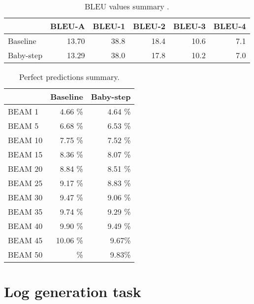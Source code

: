 \begin{table}[h!]
    \centering
    \begin{tabular}{l|r|r|r|r|r}
     & BLEU-A & BLEU-1 & BLEU-2 & BLEU-3 & BLEU-4\\ [0.5ex] 
     \hline
     Baseline & 13.70 & 38.8 & 18.4 & 10.6 & 7.1\\  
     Baby-step & 13.29 & 38.0 & 17.8 & 10.2 & 7.0\\ [1ex]
     \end{tabular}
    \caption{BLEU values summary .}
    \label{table:1}
    \end{table}



\begin{table}[h!]
    \centering
    \begin{tabular}{l|r|r} 
    & Baseline & Baby-step\\ [0.5ex] 
    \hline
    BEAM 1 & 4.66 \% & 4.64 \%\\  
    BEAM 5 & 6.68 \% & 6.53 \% \\ 
    BEAM 10 & 7.75 \% & 7.52 \%\\
    BEAM 15 & 8.36 \% & 8.07 \%\\
    BEAM 20 & 8.84 \% & 8.51 \%\\
    BEAM 25 & 9.17 \% & 8.83 \%\\
    BEAM 30 & 9.47 \% & 9.06 \%\\
    BEAM 35 & 9.74 \% & 9.29 \%\\
    BEAM 40 & 9.90 \% & 9.49 \%\\
    BEAM 45 & 10.06 \%& 9.67\%\\
    BEAM 50 & \%& 9.83\%\\ [1ex]
    \end{tabular}
    \caption{Perfect predictions summary.}
    \label{table:2}
\end{table}
\newpage
\section{Log generation task}